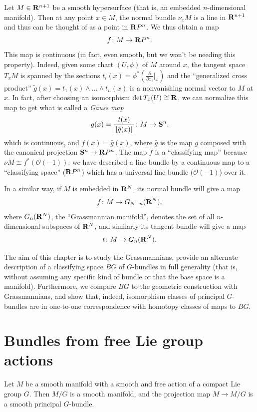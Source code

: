 \documentclass[a4paper,openany]{scrbook}
\begin{document}
Let $M \in \R^{n+1}$ be a smooth hypersurface (that is, an embedded $n$-dimensional manifold). Then at any point $x \in M$, the normal bundle $\nu_x M$ is a line in $\R^{n+1}$ and thus can be thought of as a point in $\R P^n$. We thus obtain a map
\[
f\colon M \to \R P^n.
\]
This map is continuous (in fact, even smooth, but we won't be needing this property). Indeed, given some chart $(U,\phi)$ of $M$ around $x$, the tangent space $T_xM$ is spanned by the sections $t_i(x) = \phi^*(\frac{\partial}{\partial x_i}|_x)$ and the ``generalized cross product'' $\tilde g(x) = t_1(x) \wedge \dots \wedge t_n(x)$ is a nonvanishing normal vector to $M$ at $x$. In fact, after choosing an isomorphism $\det T_x(U) \cong \R$, we can normalize this map to get what is called a \emph{Gauss map}
\[
g(x) = \frac{t(x)}{\|\tilde g(x)\|} \colon M \to \S^n,
\]
which is continuous, and $f(x) = \bar g(x)$, where $\bar g$ is the map $g$ composed with the canonical projection $\S^n \to \R P^n$. The map $f$ is a ``classifying map'' because $\nu M \cong f^*(\mathcal O(-1))$: we have described a line bundle by a continuous map to a ``classifying space'' ($\R P^n$) which has a universal line bundle ($\mathcal O(-1)$) over it.

In a similar way, if $M$ is embedded in $\R^N$, its normal bundle will give a map
\[
f\colon M \to G_{N-n}(\R^N),
\]
where $G_n(\R^N)$, the ``Grassmannian manifold'', denotes the set of all $n$-dimensional subspaces of $\R^N$, and similarly its tangent bundle will give a map
\[
t\colon M \to G_n(\R^N).
\]

The aim of this chapter is to study the Grassmannians, provide an alternate description of a classifying space $BG$ of $G$-bundles in full generality (that is, without assuming any specific kind of bundle or that the base space is a manifold). Furthermore, we compare $BG$ to the geometric construction with Grassmannians, and show that, indeed, isomorphism classes of principal $G$-bundles are in one-to-one correspondence with homotopy classes of maps to $BG$.

\section{Bundles from free Lie group actions}

\begin{thm} \label{thm:freeLiegroupaction}
Let $M$ be a smooth manifold with a smooth and free action of a compact Lie group $G$. Then $M/G$ is a smooth manifold, and the projection map $M \to M/G$ is a smooth principal $G$-bundle.
\end{thm}
\end{document}
